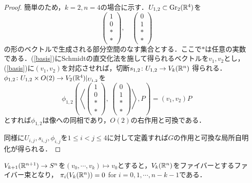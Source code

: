 \begin{proof}
  簡単のため，$k=2,n=4$の場合に示す．$U_{1,2}\subset \text{Gr}_2(\mathbb{R}^4)$を
  \begin{equation}\label{basis}
    \left(\begin{array}{c}
      1\\0\\ * \\ *
    \end{array}\right),\quad \left(\begin{array}{c}
      0\\1\\ * \\ *
    \end{array}\right)
  \end{equation}
  の形のベクトルで生成される部分空間のなす集合とする．ここで$*$は任意の実数である．(\ref{basis})にSchmidtの直交化法を施して得られるベクトルを$v_1,v_2$とし，(\ref{basis})に$(v_1,v_2)$を対応させれば，切断$s_{1,2}\colon U_{1,2}\rightarrow V_k(\mathbb{R}^n)$
  得られる．$\phi_{1,2}\colon U_{1,2}\times O(2)\rightarrow V_{2}(\mathbb{R}^4)|_{U_{1,2}}$を
  \[
  \phi_{1,2}(\left\langle
    \left(\begin{array}{c}
      1\\0\\ * \\ *
    \end{array}\right),\:\left(\begin{array}{c}
      0\\1\\ * \\ *
    \end{array}\right)
  \right\rangle, P) = (v_1,v_2)P
  \]
  とすれば$\phi_{1,2}$は像への同相であり，$O(2)$の右作用と可換である．
  
  同様に$U_{i,j},s_{i,j},\phi_{i,j}$を$1\leq i<j\leq 4$に対して定義すれば$G$の作用と可換な局所自明化が得られる．
\end{proof}

\begin{prop}
  $V_{k+1}(\mathbb{R}^{n+1})\rightarrow S^{n}$を$(v_0,\cdots,v_{k})\mapsto v_{0}$とすると，$V_{k}(\mathbb{R}^{n})$をファイバーとするファイバー束となり，
  $\pi_i(V_k(\mathbb{R}^n))=0$ for $i=0,1,\cdots,n-k-1$である．
\end{prop}

